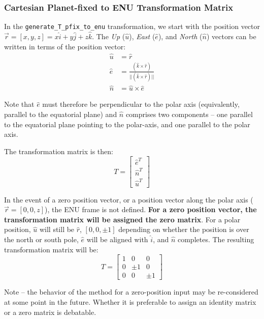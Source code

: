 \documentclass[11pt,fleqn]{report}
\begin{document}
\subsubsection{Cartesian Planet-fixed to ENU Transformation Matrix}
In the \texttt{generate\_T\_pfix\_to\_enu} transformation, we start
with the position vector
$\vec r = [x, y,z] = x \hat i + y \hat j + z \hat k$.
The \textit{Up} ($\hat u$), \textit{East} ($\hat e$), and \textit{North}
($\hat n$) vectors can be written in terms of the position vector:
\begin{align*}
\hat{u} & = \hat{r}\\
\hat{e} & = \frac{(\hat{k} \times \hat{r})}{||(\hat{k} \times \hat{r})||} \\
\hat{n} & = \hat{u} \times \hat{e}
\end{align*}

Note that $\hat e$ must therefore be perpendicular to the
polar axis (equivalently, parallel to the equatorial plane) and $\hat n$
comprises two components -- one parallel to the equatorial plane pointing to
the polar-axis, and one parallel to the polar axis.

The transformation matrix is then:
\begin{equation}
 T = \begin{bmatrix} \hat e ^T \\
 \hat n ^T \\
 \hat u ^T
 \end{bmatrix}
\end{equation}

In the event of a zero position vector, or a position vector along the polar
axis ($\vec r = [0,0,z]$), the ENU frame is not defined.
\textbf{For a zero position
vector, the transformation matrix will be assigned the zero matrix}.
For a polar
position, $\hat u$ will still be $\hat r$, $[0,0, \pm 1]$ depending on whether
the position is over the north or south pole,
$\hat e$ will be aligned with $\hat i$, and $\hat n$
completes. The resulting transformation matrix will be:
\begin{equation*}
 T = \begin{bmatrix} 1 &0 &0 \\
 0 &\pm 1 &0 \\
 0 &0 &\pm 1
 \end{bmatrix}
\end{equation*}

Note -- the behavior of the method for a zero-position input may be
re-considered at some point in the future.
Whether it is preferable to assign an identity matrix or a zero
matrix is debatable.
\end{document}
